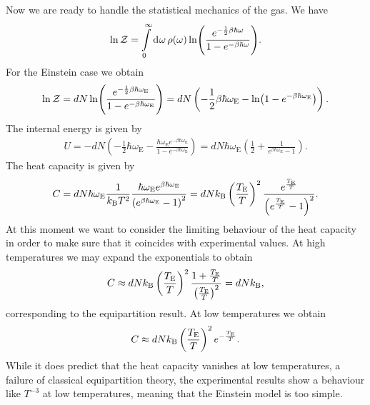 Now we are ready to handle the statistical mechanics of the gas. We have
\begin{align*}
	\ln{\mathcal{Z}} = \int\limits_{0}^{\infty}\dd[]{\omega}\rho(\omega)\ln(\frac{e^{-\frac{1}{2}\beta\hbar\omega}}{1 - e^{-\beta\hbar\omega}}).
\end{align*}
For the Einstein case we obtain
\begin{align*}
	\ln{\mathcal{Z}} = dN\ln(\frac{e^{-\frac{1}{2}\beta\hbar\omega_{\text{E}}}}{1 - e^{-\beta\hbar\omega_{\text{E}}}}) = dN\left(-\frac{1}{2}\beta\hbar\omega_{\text{E}} - \ln(1 - e^{-\beta\hbar\omega_{\text{E}}})\right).
\end{align*}
The internal energy is given by
\begin{align*}
	U = -dN\left(-\frac{1}{2}\hbar\omega_{\text{E}} - \frac{\hbar\omega_{\text{E}}e^{-\beta\hbar\omega_{\text{E}}}}{1 - e^{-\beta\hbar\omega_{\text{E}}}}\right) = dN\hbar\omega_{\text{E}}\left(\frac{1}{2} + \frac{1}{e^{\beta\hbar\omega_{\text{E}}} - 1}\right).
\end{align*}
The heat capacity is given by
\begin{align*}
	C = dN\hbar\omega_{\text{E}}\frac{1}{k_{\text{B}} T^{2}}\frac{\hbar\omega_{\text{E}}e^{\beta\hbar\omega_{\text{E}}}}{\left(e^{\beta\hbar\omega_{\text{E}}} - 1\right)^{2}} = dNk_{\text{B}}\left(\frac{T_{\text{E}}}{T}\right)^{2}\frac{e^{\frac{T_{\text{E}}}{T}}}{\left(e^{\frac{T_{\text{E}}}{T}} - 1\right)^{2}}.
\end{align*}
At this moment we want to consider the limiting behaviour of the heat capacity in order to make sure that it coincides with experimental values. At high temperatures we may expand the exponentials to obtain
\begin{align*}
	C \approx dNk_{\text{B}}\left(\frac{T_{\text{E}}}{T}\right)^{2}\frac{1 + \frac{T_{\text{E}}}{T}}{\left(\frac{T_{\text{E}}}{T}\right)^{2}} = dNk_{\text{B}},
\end{align*}
corresponding to the equipartition result. At low temperatures we obtain
\begin{align*}
	C \approx dNk_{\text{B}}\left(\frac{T_{\text{E}}}{T}\right)^{2}e^{-\frac{T_{\text{E}}}{T}}.
\end{align*}
While it does predict that the heat capacity vanishes at low temperatures, a failure of classical equipartition theory, the experimental results show a behaviour like $T^{-3}$ at low temperatures, meaning that the Einstein model is too simple.

